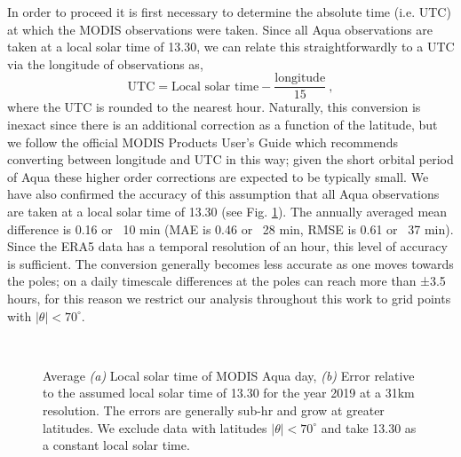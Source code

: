 \documentclass[twocolumn]{article}
\begin{document}
\noindent In order to proceed it is first necessary to determine the absolute time (i.e. UTC) at which the MODIS observations were taken. Since all Aqua observations are taken at a local solar time of 13.30, we can relate this straightforwardly to a UTC via the longitude of observations as,  
\begin{equation}
	\text{UTC} = \text{Local solar time} - \frac{\text{longitude}}{15} \ , 
\end{equation}
where the UTC is rounded to the nearest hour. Naturally, this conversion is inexact since there is an additional correction as a function of the latitude, but we follow the official MODIS Products User’s Guide\cite{MODISusersguide} which recommends converting between longitude and UTC in this way; given the short orbital period of Aqua these higher order corrections are expected to be typically small. We have also confirmed the accuracy of this assumption that all Aqua observations are taken at a local solar time of 13.30 (see Fig. \ref{fig:MODIS_time}). The annually averaged mean difference is 0.16 or ~10 min (MAE is 0.46 or ~28 min, RMSE is 0.61 or ~37 min).  Since the ERA5 data has a temporal resolution of an hour, this level of accuracy is sufficient. The conversion generally becomes less accurate as one moves towards the poles; on a daily timescale differences at the poles can reach more than ±3.5 hours, for this reason we restrict our analysis throughout this work to grid points with $|\theta| < 70^{\circ}$. \newline 
\begin{figure}
	 \\
	\caption{Average \textit{(a)} Local solar time of MODIS Aqua day, \textit{(b)} Error relative to the assumed local solar time of 13.30 for the year 2019 at a 31km resolution. The errors are generally sub-hr and grow at greater latitudes. We exclude data with latitudes $|\theta| < 70^{\circ}$ and take 13.30 as a constant local solar time.} 
	\label{fig:MODIS_time}
\end{figure}
\end{document}
